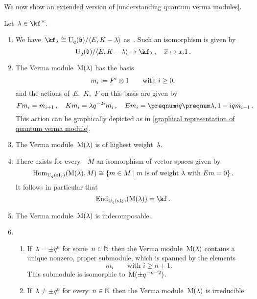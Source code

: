 \documentclass[a4paper, 11pt, oneside]{scrartcl}
\begin{document}
We now show an extended version of \cref{understanding quantum verma modules}.

\begin{proposition}
  Let~$\lambda \in \kf^\times$.
  \begin{enumerate}
    \item
      We have~$\kf_\lambda \cong \Univ_q(\blie) / \gen{E, K - \lambda}$ as~.
      Such an isomorphism is given by
      \[
        \Univ_q(\blie) / \gen{E, K - \lambda}
        \to
        \kf_\lambda \,,
        \quad
        \class{x}
        \mapsto
        x.1 \,.
      \]
    \item
      The Verma module~$\operatorname{M}(\lambda)$ has the basis
      \[
        m_i
        \coloneqq
        F^i \otimes 1
        \qquad
        \text{with~$i \geq 0$,}
      \]
      and the actions of~$E$,~$K$,~$F$ on this basis are given by
      \[
        F m_i = m_{i+1} \,,
        \quad
        K m_i = \lambda q^{-2i} m_i \,,
        \quad
        E m_i = \qnum{i} \qnum{\lambda, 1-i} m_{i-1} \,.
      \]
      This action can be graphically depicted as in \cref{graphical representation of quantum verma module}.
    \item
      The Verma module~$\operatorname{M}(\lambda)$ is of highest weight~$\lambda$.
    \item
      There exists for every~~$M$ an isomorphism of vector spaces given by
      \[
        \Hom_{\Univ_q(\sllie_2)}( \verma(\lambda), M )
        \cong
        \{
          m \in M
        \suchthat
          \text{$m$ is of weight~$\lambda$ with~$Em = 0$}
        \} \,.
      \]
      It follows in particular that
      \[
        \End_{\Univ_q(\sllie_2)}( \verma(\lambda) )
        =
        \kf \,.
      \]
    \item
      The Verma module~$\operatorname{M}(\lambda)$ is indecomposable.
    \item
      \begin{enumerate}
        \item
          If~$\lambda = \pm q^n$ for some~$n \in \mathbb{N}$ then the Verma module~$\operatorname{M}(\lambda)$ contains a unique nonzero, proper submodule, which is spanned by the elements
          \[
            m_i
            \qquad
            \text{with~$i \geq n+1$.}
          \]
          This submodule is isomorphic to~$\operatorname{M}(\pm q^{-n-2})$.
        \item
          If~$\lambda \neq \pm q^n$ for every~$n \in \mathbb{N}$ then the Verma module~$\operatorname{M}(\lambda)$ is irreducible.
      \end{enumerate}
  \end{enumerate}
\end{proposition}
\end{document}
